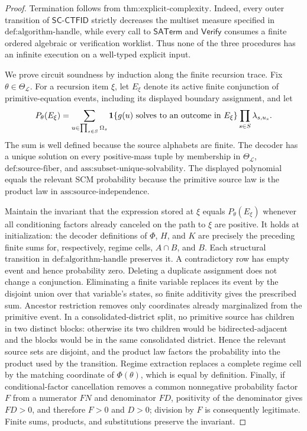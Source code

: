 \documentclass{article}
\begin{document}
\begin{proof}
Termination follows from \(\text{thm:explicit-complexity}\).  Indeed, every outer transition of \(\mathsf{SC\mbox{-}CTFID}\) strictly decreases the multiset measure specified in \(\text{def:algorithm-handle}\), while every call to \(\mathsf{SATerm}\) and \(\mathsf{Verify}\) consumes a finite ordered algebraic or verification worklist.  Thus none of the three procedures has an infinite execution on a well-typed explicit input.

We prove circuit soundness by induction along the finite recursion trace.  Fix \(\theta\in\Theta_{\mathcal L}\).  For a recursion item \(\xi\), let \(E_\xi\) denote its active finite conjunction of primitive-equation events, including its displayed boundary assignment, and let
\[
 P_\theta(E_\xi)
 =\sum_{u\in\prod_{s\in S}\Omega_s}
   {\bf 1}\{g(u)\text{ solves to an outcome in }E_\xi\}
   \prod_{s\in S}\lambda_{s,u_s}.
\]
The sum is well defined because the source alphabets are finite.  The decoder has a unique solution on every positive-mass tuple by membership in \(\Theta_{\mathcal L}\), \(\text{def:source-fiber}\), and \(\text{ass:subset-unique-solvability}\).  The displayed polynomial equals the relevant SCM probability because the primitive source law is the product law in \(\text{ass:source-independence}\).

Maintain the invariant that the expression stored at \(\xi\) equals \(P_\theta(E_\xi)\) whenever all conditioning factors already canceled on the path to \(\xi\) are positive.  It holds at initialization: the decoder definitions of \(\Phi\), \(H\), and \(K\) are precisely the preceding finite sums for, respectively, regime cells, \(A\cap B\), and \(B\).  Each structural transition in \(\text{def:algorithm-handle}\) preserves it.  A contradictory row has empty event and hence probability zero.  Deleting a duplicate assignment does not change a conjunction.  Eliminating a finite variable replaces its event by the disjoint union over that variable's states, so finite additivity gives the prescribed sum.  Ancestor restriction removes only coordinates already marginalized from the primitive event.  In a consolidated-district split, no primitive source has children in two distinct blocks: otherwise its two children would be bidirected-adjacent and the blocks would be in the same consolidated district.  Hence the relevant source sets are disjoint, and the product law factors the probability into the product used by the transition.  Regime extraction replaces a complete regime cell by the matching coordinate of \(\Phi(\theta)\), which is equal by definition.  Finally, if conditional-factor cancellation removes a common nonnegative probability factor \(F\) from a numerator \(FN\) and denominator \(FD\), positivity of the denominator gives \(FD>0\), and therefore \(F>0\) and \(D>0\); division by \(F\) is consequently legitimate.  Finite sums, products, and substitutions preserve the invariant.


\end{proof}
\end{document}

